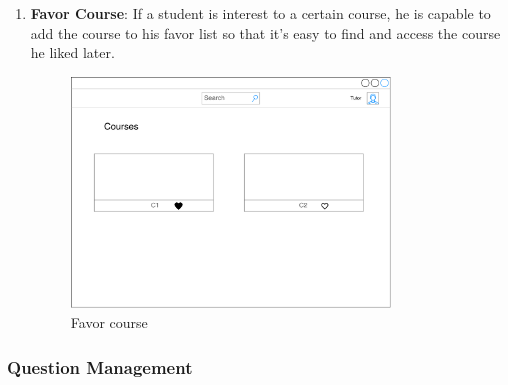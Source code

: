 \begin{enumerate}
\item
\textbf{Favor Course}: If a student is interest to a certain course, he is capable to add the course to his favor list so that it's easy to find and access the course he liked later.

\begin{figure}[!htbp]
  \centering
    \includegraphics[width=0.8\textwidth]{Figures/mockup/Favour-Course.pdf}
  \caption{Favor course}
\end{figure}

\end{enumerate}

\subsubsection{Question Management}

